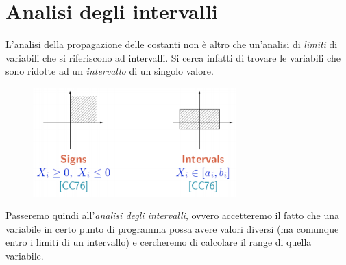 \documentclass[a4paper,oneside,titlepage]{book}
\begin{document}
\section{Analisi degli intervalli} %
\label{int1}
L'analisi della propagazione delle costanti non è altro che un'analisi di \textit{limiti} di variabili che si riferiscono ad intervalli. Si cerca infatti di trovare le variabili che sono ridotte ad un \textit{intervallo} di un singolo valore.
\begin{figure}[htp]
	\centering
	\includegraphics[width=0.7\textwidth]{int1.png}
\end{figure}

\noindent
Passeremo quindi all'\textit{analisi degli intervalli}, ovvero accetteremo il fatto che una variabile in certo punto di programma possa avere valori diversi (ma comunque entro i limiti di un intervallo) e cercheremo di calcolare il range di quella variabile.
\end{document}
